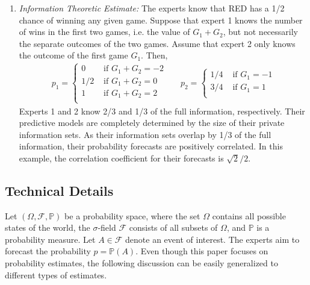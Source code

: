 \documentclass[11pt,twoside]{article}
\renewcommand{\P}{\mathbb{P}}
\begin{document}
\begin{enumerate}
\item[] \textit{Information Theoretic Estimate:} The experts know that RED has a 1/2 chance of winning any given game. Suppose that expert 1 knows the number of wins in the first two games, i.e. the value of $G_1 + G_2$, but not necessarily the separate outcomes of the two games. Assume that expert 2 only knows the outcome of the first game $G_1$. Then,
\begin{align*}
p_1 = \begin{cases}
0 & \text{ if } G_1 + G_2 = -2\\
1/2 & \text{ if } G_1 + G_2 = 0\\
1 & \text{ if } G_1 + G_2 = 2\\
\end{cases}
&& p_2 = \begin{cases}
1/4 & \text{ if } G_1 = -1\\
3/4 & \text{ if } G_1 = 1\\
\end{cases}
\end{align*}
Experts 1 and 2 know 2/3 and 1/3 of the full information, respectively. Their predictive models are completely determined by the size of their private information sets. As their information sets overlap by 1/3 of the full information, their probability forecasts are positively correlated. In this example, the correlation coefficient for their forecasts is $\sqrt{2}/2$.  


\end{enumerate}


\subsection{Technical Details}
Let  $(\Omega, \mathcal{F}, \P)$ be a probability space, where the set $\Omega$ contains all possible states of the world, the $\sigma$-field $\mathcal{F}$ consists of all subsets of $\Omega$, and $\P$ is a probability measure. Let $A \in \mathcal{F}$ denote an event of interest. 
The experts aim to forecast the probability $p = \P(A)$. Even though this paper focuses on probability estimates, the following discussion can be easily generalized to different types of estimates. 
\end{document}
